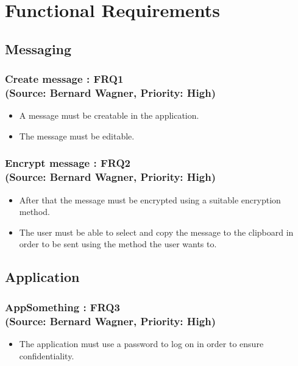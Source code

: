 \section{Functional Requirements}

\vspace{12pt}


\subsection*{\Large{\textbf{Messaging}}}
\normalsize
\vspace{12pt}


\subsubsection*{Create message : FRQ1\\(Source: Bernard Wagner, Priority: High)}%
\begin{itemize}
\item A message must be creatable in the application.
\item The message must be editable.
\end{itemize}

\subsubsection*{Encrypt message : FRQ2\\(Source: Bernard Wagner, Priority: High)}
\begin{itemize}
\item After that the message must be encrypted using a suitable encryption method.
\item The user must be able to select and copy the message to the clipboard in order to be sent using the method the user wants to.
\end{itemize}


\subsection*{\Large{\textbf{Application}}}


\subsubsection*{AppSomething : FRQ3\\(Source: Bernard Wagner, Priority: High)}%
\begin{itemize}
\item The application must use a password to log on in order to ensure confidentiality.
\end{itemize}


